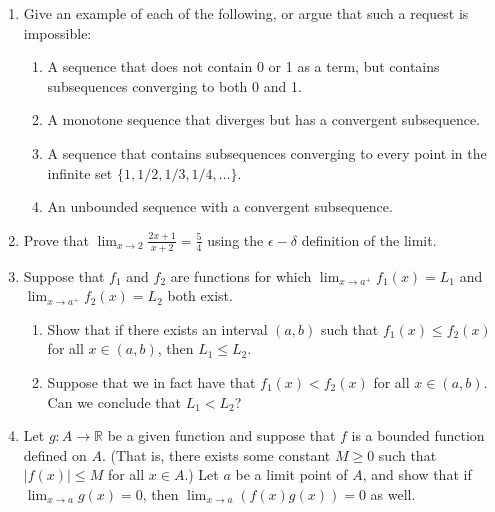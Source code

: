 \documentclass[letterpaper,12pt]{article}
\newcommand{\R}{\mathbb{R}}
\newcommand{\abs}[1]{\lvert #1\rvert}
\begin{document}
\begin{enumerate}
 \item Give an example of each of the following, or argue that such a request is impossible:
\begin{enumerate}
 \item A sequence that does not contain 0 or 1 as a term, but contains subsequences converging to both 0 and 1.
 \item A monotone sequence that diverges but has a convergent subsequence.
 \item A sequence that contains subsequences converging to every point in the infinite set $\{1,1/2, 1/3, 1/4, \ldots\}$.
 \item An unbounded sequence with a convergent subsequence.
\end{enumerate}
 \item Prove that $\displaystyle \lim_{x\to 2}\frac{2x+1}{x+2} = \frac{5}{4}$ using the $\epsilon-\delta$ definition of the limit.
 \item Suppose that $f_1$ and $f_2$ are functions for which $\lim_{x\to a^+}f_1(x) = L_1$ and $\lim_{x\to a^+}f_2(x) = L_2$ both exist.
\begin{enumerate}
 \item Show that if there exists an interval $(a,b)$ such that $f_1(x)\leq f_2(x)$ for all $x\in (a,b)$, then $L_1\leq L_2$. 
 \item Suppose that we in fact have that $f_1(x)<f_2(x)$ for all $x\in (a,b)$. Can we conclude that $L_1<L_2$?
\end{enumerate}
 \item Let $g:A\to \R$ be a given function and suppose that $f$ is a bounded function defined on $A$. (That is, there exists some constant $M\geq 0$ such that $\abs{f(x)}\leq M$ for all $x\in A$.) Let $a$ be a limit point of $A$, and show that if $\displaystyle \lim_{x\to a}g(x)=0$, then $\displaystyle \lim_{x\to a}(f(x)g(x))=0$ as well.



\end{enumerate}
\end{document}
